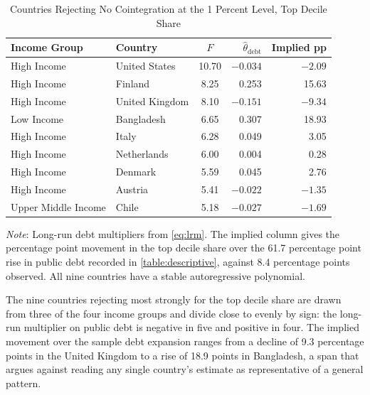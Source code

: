 \documentclass[12pt, titlepage]{article}
\numberwithin{equation}{section}
\begin{document}
\begin{table}[htbp]
	\centering
	\begin{threeparttable}
		\caption{Countries Rejecting No Cointegration at the 1 Percent Level, Top Decile Share}
		\label{table:bounds_countries}
		\begin{small}
			\begin{tabular}{llcrr}
				\toprule
				\textbf{Income Group} & \textbf{Country} & \textbf{$F$} & \textbf{$\hat\theta_{\text{debt}}$} & \textbf{Implied pp} \\
				\midrule
				High Income          & United States  & 10.70 & $-0.034$           & $-2.09$          \\
				High Income          & Finland        & 8.25  & \phantom{$-$}0.253 & \phantom{$-$}15.63 \\
				High Income          & United Kingdom & 8.10  & $-0.151$           & $-9.34$          \\
				Low Income           & Bangladesh     & 6.65  & \phantom{$-$}0.307 & \phantom{$-$}18.93 \\
				High Income          & Italy          & 6.28  & \phantom{$-$}0.049 & \phantom{$-$}3.05  \\
				High Income          & Netherlands    & 6.00  & \phantom{$-$}0.004 & \phantom{$-$}0.28  \\
				High Income          & Denmark        & 5.59  & \phantom{$-$}0.045 & \phantom{$-$}2.76  \\
				High Income          & Austria        & 5.41  & $-0.022$           & $-1.35$          \\
				Upper Middle Income  & Chile          & 5.18  & $-0.027$           & $-1.69$          \\
				\bottomrule
			\end{tabular}
		\end{small}
		\begin{tablenotes}
			\footnotesize
			\item \emph{Note}: Long-run debt multipliers from \eqref{eq:lrm}. The
			implied column gives the percentage point movement in the top decile
			share over the 61.7 percentage point rise in public debt recorded in
			\autoref{table:descriptive}, against 8.4 percentage points observed. All
			nine countries have a stable autoregressive polynomial.
		\end{tablenotes}
	\end{threeparttable}
\end{table}

The nine countries rejecting most strongly for the top decile share are drawn
from three of the four income groups and divide close to evenly by sign: the
long-run multiplier on public debt is negative in five and positive in four.
The implied movement over the sample debt expansion ranges from a decline of
9.3 percentage points in the United Kingdom to a rise of 18.9 points in
Bangladesh, a span that argues against reading any single country's estimate
as representative of a general pattern.
\end{document}

